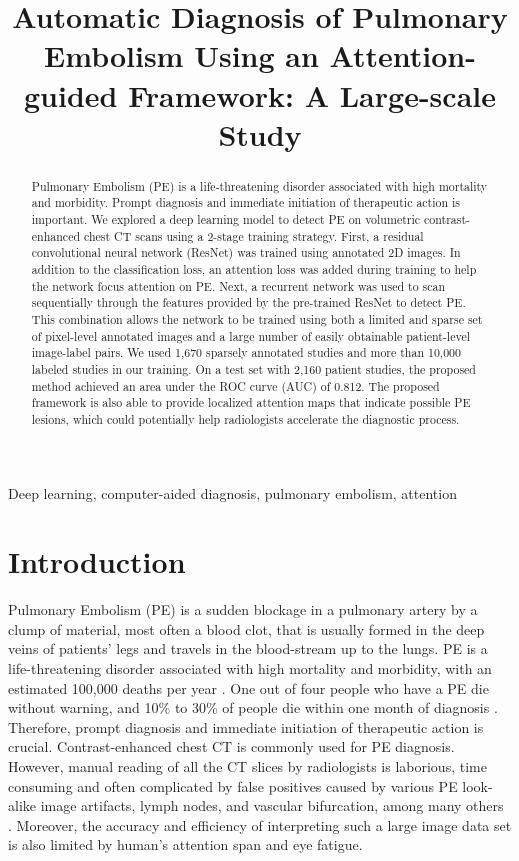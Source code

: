 \documentclass{midl} %
\title[Automatic Diagnosis of Pulmonary Embolism]{Automatic Diagnosis of Pulmonary Embolism Using an Attention-guided Framework: A Large-scale Study}
\begin{document}
\maketitle

\begin{abstract}
Pulmonary Embolism (PE) is a life-threatening disorder associated with high mortality and morbidity. Prompt diagnosis and immediate initiation of therapeutic action is important. We explored a deep learning model to detect PE on volumetric contrast-enhanced chest CT scans using a 2-stage training strategy. First, a residual convolutional neural network (ResNet) was trained using annotated 2D images. In addition to the classification loss, an attention loss was added during training to help the network focus attention on PE. Next, a recurrent network was used to scan sequentially through the features provided by the pre-trained ResNet to detect PE. This combination allows the network to be trained using both a limited and sparse set of pixel-level annotated images and a large number of easily obtainable patient-level image-label pairs. We used 1,670 sparsely annotated studies and more than 10,000 labeled studies in our training. On a test set with 2,160 patient studies, the proposed method achieved an area under the ROC curve (AUC) of 0.812. The proposed framework is also able to provide localized attention maps that indicate possible PE lesions, which could potentially help radiologists accelerate the diagnostic process.
\end{abstract}

\begin{keywords}
Deep learning, computer-aided diagnosis, pulmonary embolism, attention
\end{keywords}

\section{Introduction}
\label{sec:intro}

Pulmonary Embolism (PE) is a sudden blockage in a pulmonary artery by a clump of material, most often a blood clot, that is usually formed in the deep veins of patients' legs and travels in the blood-stream up to the lungs. PE is a life-threatening disorder associated with high mortality and morbidity, with an estimated 100,000 deaths per year \cite{beckman2010venous}. One out of four people who have a PE die without warning, and 10\% to 30\% of people die within one month of diagnosis \cite{beckman2010venous}. Therefore, prompt diagnosis and immediate initiation of therapeutic action is crucial.  Contrast-enhanced chest CT is commonly used for PE diagnosis. However, manual reading of all the CT slices by radiologists is laborious, time consuming and often complicated by false positives caused by various PE look-alike image artifacts, lymph nodes, and vascular bifurcation, among many others \cite{liang2007computer}. Moreover, the accuracy and efficiency of interpreting such a large image data set is also limited by human's attention span and eye fatigue. 
\end{document}

